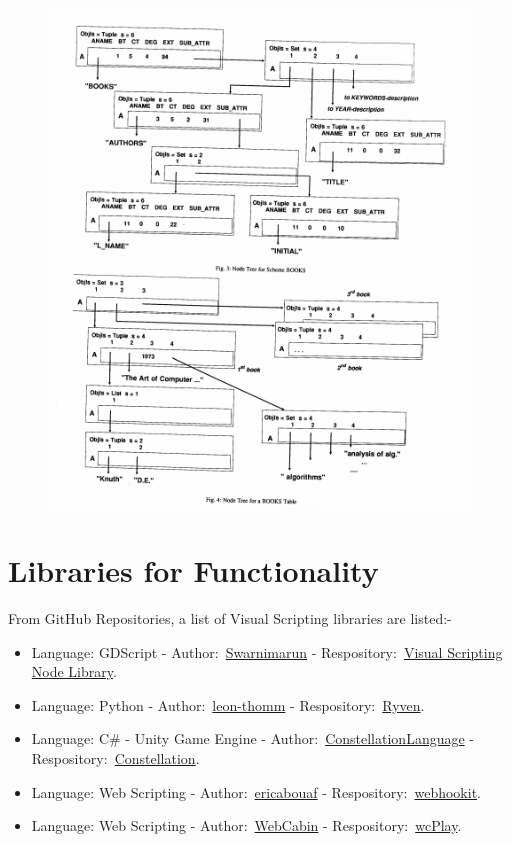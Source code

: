 \documentclass[12pt]{report} %
\begin{document}
		\begin{figure}[H]
			{\includegraphics[scale=0.6]{Figures/VPDBEDIT.png}}
		\end{figure}

	\section{Libraries for Functionality}
		From GitHub Repositories, a list of Visual Scripting libraries are listed:-
		\begin{itemize}
		\item Language: GDScript - Author:~\href{https://github.com/swarnimarun}{Swarnimarun} - Respository:~\href{https://github.com/swarnimarun/visual-scripting-node-library}{Visual Scripting Node Library}.
		\item Language: Python - Author:~\href{https://github.com/leon-thomm}{leon-thomm} - Respository:~\href{https://github.com/leon-thomm/Ryven}{Ryven}.
		\item Language: C\# - Unity Game Engine - Author:~\href{https://github.com/ConstellationLanguage}{ConstellationLanguage} - Respository:~\href{https://github.com/ConstellationLanguage/Constellation}{Constellation}.
		\item Language: Web Scripting - Author:~\href{https://github.com/ericabouaf}{ericabouaf} - Respository:~\href{https://github.com/ericabouaf/webhookit}{webhookit}.
		\item Language: Web Scripting - Author:~\href{https://github.com/WebCabin}{WebCabin} - Respository:~\href{https://github.com/WebCabin/wcPlay}{wcPlay}.
		\end{itemize}
\end{document}
